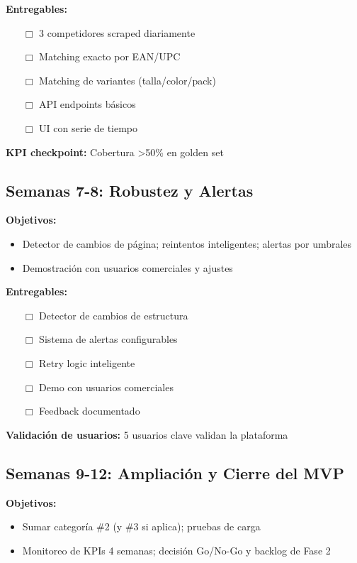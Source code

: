 \documentclass[12pt,a4paper]{article}
\begin{document}
\textbf{Entregables:}
\begin{itemize}[leftmargin=*]
    \item[$\Box$] 3 competidores scraped diariamente
    \item[$\Box$] Matching exacto por EAN/UPC
    \item[$\Box$] Matching de variantes (talla/color/pack)
    \item[$\Box$] API endpoints básicos
    \item[$\Box$] UI con serie de tiempo
\end{itemize}

\textbf{\textcolor{successgreen}{KPI checkpoint:}} Cobertura >50\% en golden set

\subsection{Semanas 7-8: Robustez y Alertas}

\textbf{Objetivos:}
\begin{itemize}[leftmargin=*]
    \item Detector de cambios de página; reintentos inteligentes; alertas por umbrales
    \item Demostración con usuarios comerciales y ajustes
\end{itemize}

\textbf{Entregables:}
\begin{itemize}[leftmargin=*]
    \item[$\Box$] Detector de cambios de estructura
    \item[$\Box$] Sistema de alertas configurables
    \item[$\Box$] Retry logic inteligente
    \item[$\Box$] Demo con usuarios comerciales
    \item[$\Box$] Feedback documentado
\end{itemize}

\textbf{\textcolor{successgreen}{Validación de usuarios:}} 5 usuarios clave validan la plataforma

\subsection{Semanas 9-12: Ampliación y Cierre del MVP}

\textbf{Objetivos:}
\begin{itemize}[leftmargin=*]
    \item Sumar categoría \#2 (y \#3 si aplica); pruebas de carga
    \item Monitoreo de KPIs 4 semanas; decisión Go/No-Go y backlog de Fase 2
\end{itemize}
\end{document}
